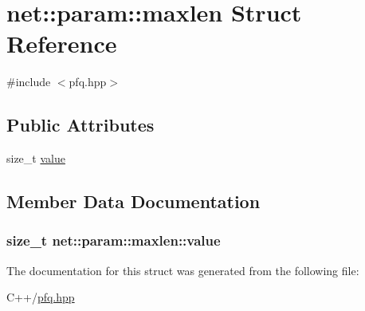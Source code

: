 \hypertarget{structnet_1_1param_1_1maxlen}{\section{net\+:\+:param\+:\+:maxlen Struct Reference}
\label{structnet_1_1param_1_1maxlen}
}


{\ttfamily \#include $<$pfq.\+hpp$>$}

\subsection*{Public Attributes}
\begin{DoxyCompactItemize}
\item 
size\+\_\+t \hyperlink{structnet_1_1param_1_1maxlen_aa6980872f44af9803747a76004a1c55a}{value}
\end{DoxyCompactItemize}


\subsection{Member Data Documentation}
\hypertarget{structnet_1_1param_1_1maxlen_aa6980872f44af9803747a76004a1c55a}{
\subsubsection[{value}]{\setlength{\rightskip}{0pt plus 5cm}size\+\_\+t net\+::param\+::maxlen\+::value}}\label{structnet_1_1param_1_1maxlen_aa6980872f44af9803747a76004a1c55a}


The documentation for this struct was generated from the following file\+:\begin{DoxyCompactItemize}
\item 
C++/\hyperlink{pfq_8hpp}{pfq.\+hpp}\end{DoxyCompactItemize}
